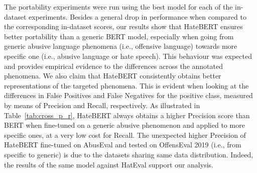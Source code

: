 \documentclass[11pt]{article}
\begin{document}
The portability experiments were run using the best model for each of the in-dataset experiments. Besides a general drop in performance when compared to the corresponding in-dataset scores, our results show that HateBERT ensures better portability than a generic BERT model, especially when going from generic abusive language phenomena (i.e., offensive language) towards more specific one (i.e., abusive language or hate speech). This behaviour was expected and provides empirical evidence to the differences across the annotated phenomena. We also claim that HateBERT consistently obtains better representations of the targeted phenomena. This is evident when looking at the differences in False Positives and False Negatives for the positive class, measured by means of Precision and Recall, respectively. As illustrated in Table~\ref{tab:cross_p_r}, HateBERT always obtains a higher Precision score than BERT when fine-tuned on a generic abusive phenomenon and applied to more specific ones, at a very low cost for Recall. The unexpected higher Precision of HateBERT fine-tuned on AbusEval and tested on OffensEval 2019 (i.e., from specific to generic) is due to the datasets sharing same data distribution. Indeed, the results of the same model against HatEval support our analysis.  
\end{document}
